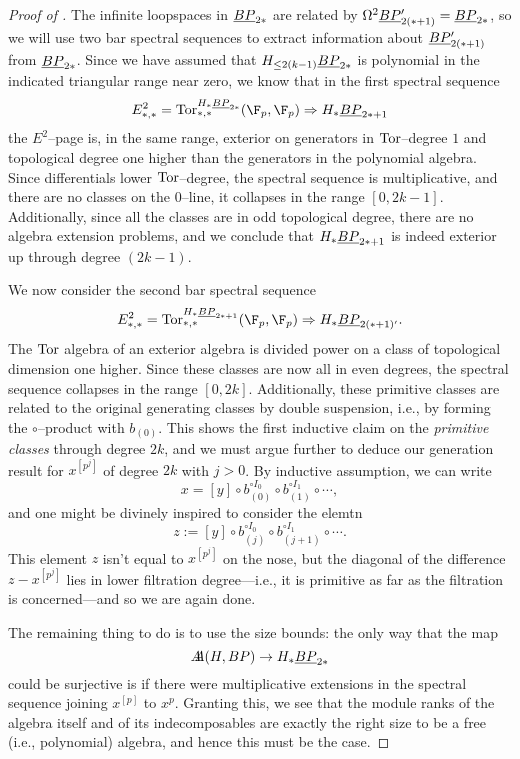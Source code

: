 \begin{proof}[{Proof of }]
The infinite loopspaces in $\underline{\smash{BP}}_{2*}$ are related by $\Omega^2 \underline{\smash{BP}}_{2(*+1)}' = \underline{\smash{BP}}_{2*}$, so we will use two bar spectral sequences to extract information about $\underline{\smash{BP}}_{2(*+1)}'$ from $\underline{\smash{BP}}_{2*}$.  Since we have assumed that $H_{\le 2(k-1)} \underline{\smash{BP}}_{2*}$ is polynomial in the indicated triangular range near zero, we know that in the first spectral sequence \[E^2_{*, *} = \Tor^{H_* \OS{BP}{2*}}_{*, *}(\F_p, \F_p) \Rightarrow H_* \OS{BP}{2*+1}\] the $E^2$--page is, in the same range, exterior on generators in $\operatorname{Tor}$--degree $1$ and topological degree one higher than the generators in the polynomial algebra.  Since differentials lower $\operatorname{Tor}$--degree, the spectral sequence is multiplicative, and there are no classes on the $0$--line, it collapses in the range $[0, 2k-1]$.  Additionally, since all the classes are in odd topological degree, there are no algebra extension problems, and we conclude that $H_* \underline{\smash{BP}}_{2*+1}$ is indeed exterior up through degree $(2k-1)$.

We now consider the second bar spectral sequence \[E^2_{*, *} = \Tor^{H_* \OS{BP}{2*+1}}_{*, *}(\F_p, \F_p) \Rightarrow H_* \OS{BP}{2(*+1)'}.\]  The $\operatorname{Tor}$ algebra of an exterior algebra is divided power on a class of topological dimension one higher.  Since these classes are now all in even degrees, the spectral sequence collapses in the range $[0, 2k]$.  Additionally, these primitive classes are related to the original generating classes by double suspension, i.e., by forming the $\circ$--product with $b_{(0)}$.  This shows the first inductive claim on the \emph{primitive classes} through degree $2k$, and we must argue further to deduce our generation result for $x^{[p^j]}$ of degree $2k$ with $j > 0$.  By inductive assumption, we can write \[x = [y] \circ b_{(0)}^{\circ I_0} \circ b_{(1)}^{\circ I_1} \circ \cdots,\] and one might be divinely inspired to consider the elemtn \[z := [y] \circ b_{(j)}^{\circ I_0} \circ b_{(j+1)}^{\circ I_1} \circ \cdots.\]  This element $z$ isn't equal to $x^{[p^j]}$ on the nose, but the diagonal of the difference $z - x^{[p^j]}$ lies in lower filtration degree---i.e., it is primitive as far as the filtration is concerned---and so we are again done.

The remaining thing to do is to use the size bounds: the only way that the map \[A\!\!\!A(H, BP) \to H_* \underline{\smash{BP}}_{2*}\] could be surjective is if there were multiplicative extensions in the spectral sequence joining $x^{[p]}$ to $x^p$.  Granting this, we see that the module ranks of the algebra itself and of its indecomposables are exactly the right size to be a free (i.e., polynomial) algebra, and hence this must be the case.
\end{proof}

